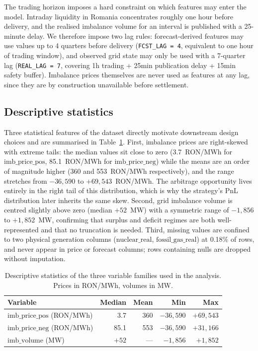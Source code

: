 \documentclass{article}
\begin{document}
The trading horizon imposes a hard constraint on which features may enter the model. Intraday liquidity in Romania concentrates roughly one hour before delivery, and the realised imbalance volume for an interval is published with a 25-minute delay. We therefore impose two lag rules: forecast-derived features may use values up to 4 quarters before delivery (\texttt{FCST\_LAG = 4}, equivalent to one hour of trading window), and observed grid state may only be used with a 7-quarter lag (\texttt{REAL\_LAG = 7}, covering 1h trading + 25min publication delay + 15min safety buffer). Imbalance prices themselves are never used as features at any lag, since they are by construction unavailable before settlement.

\subsection{Descriptive statistics}

Three statistical features of the dataset directly motivate downstream design choices and are summarised in Table~\ref{tab:descriptive}. First, imbalance prices are right-skewed with extreme tails: the median values sit close to zero (3.7~RON/MWh for $\text{imb\_price\_pos}$, 85.1~RON/MWh for $\text{imb\_price\_neg}$) while the means are an order of magnitude higher (360 and 553~RON/MWh respectively), and the range stretches from $-36{,}590$ to $+69{,}543$~RON/MWh. The arbitrage opportunity lives entirely in the right tail of this distribution, which is why the strategy's PnL distribution later inherits the same skew. Second, grid imbalance volume is centred slightly above zero (median $+52$~MW) with a symmetric range of $-1{,}856$ to $+1{,}852$~MW, confirming that surplus and deficit regimes are both well-represented and that no truncation is needed. Third, missing values are confined to two physical generation columns ($\text{nuclear\_real}$, $\text{fossil\_gas\_real}$) at 0.18\% of rows, and never appear in price or forecast columns; rows containing nulls are dropped without imputation.

\begin{table}[t!]
\centering
\caption{Descriptive statistics of the three variable families used in the analysis. Prices in RON/MWh, volumes in MW.}
\label{tab:descriptive}
\begin{tabular}{lrrrr}
\toprule
\textbf{Variable} & \textbf{Median} & \textbf{Mean} & \textbf{Min} & \textbf{Max} \\
\midrule
$\text{imb\_price\_pos}$ (RON/MWh) & 3.7 & 360 & $-36{,}590$ & $+69{,}543$ \\
$\text{imb\_price\_neg}$ (RON/MWh) & 85.1 & 553 & $-36{,}590$ & $+31{,}166$ \\
$\text{imb\_volume}$ (MW) & $+52$ & --- & $-1{,}856$ & $+1{,}852$ \\
\bottomrule
\end{tabular}
\end{table}
\end{document}
